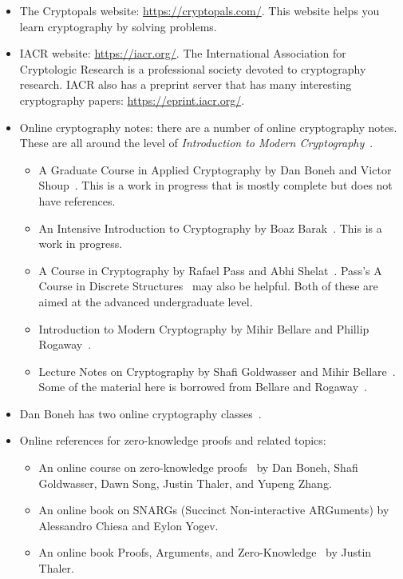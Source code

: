 \begin{itemize}
\item The Cryptopals website: \url{https://cryptopals.com/}.
    This website helps you learn cryptography by solving problems.
\item IACR website: \url{https://iacr.org/}.
    The International Association for Cryptologic Research
    is a professional society devoted to cryptography research.
    IACR also has a preprint server that has many interesting
    cryptography papers: \url{https://eprint.iacr.org/}.
\item Online cryptography notes:
    there are a number of online cryptography notes.
    These are all around the level of
    \emph{Introduction to Modern Cryptography}~\cite{IntroModernCrypto}.

    \begin{itemize}
    \item A Graduate Course in Applied Cryptography
        by Dan Boneh and Victor Shoup~\cite{BonehShoupGraduateApplied}.
        This is a work in progress that is mostly complete
        but does not have references.
    \item An Intensive Introduction to Cryptography
        by Boaz Barak~\cite{IntensiveCrypto}.
        This is a work in progress.
    \item A Course in Cryptography
        by Rafael Pass and Abhi Shelat~\cite{CourseCrypto}.
        Pass's A Course in Discrete Structures~\cite{CourseDiscreteStructures}
        may also be helpful.
        Both of these are aimed at the advanced undergraduate level.
    \item Introduction to Modern Cryptography
        by Mihir Bellare and Phillip Rogaway~\cite{BellareRogawayIMC}.
    \item Lecture Notes on Cryptography
        by Shafi Goldwasser and Mihir Bellare~\cite{GoldwasserBellareLNC}.
        Some of the material here is borrowed from
        Bellare and Rogaway~\cite{BellareRogawayIMC}.
    \end{itemize}
\item Dan Boneh has two online cryptography
    classes~\cite{BonehCourseraCryptoI,BonehCourseraCryptoII}.
\item Online references for zero-knowledge proofs and related topics:
    \begin{itemize}
    \item An online course on zero-knowledge proofs~\cite{OnlineMOOCZKProofs}
        by Dan Boneh, Shafi Goldwasser, Dawn Song, Justin Thaler,
        and Yupeng Zhang.
    \item An online book on SNARGs (Succinct Non-interactive ARGuments)
        \cite{SnargsBook} by Alessandro Chiesa and Eylon Yogev.
    \item An online book Proofs, Arguments,
        and Zero-Knowledge~\cite{ThalerProofsZK} by Justin Thaler.
    \end{itemize}
\end{itemize}

